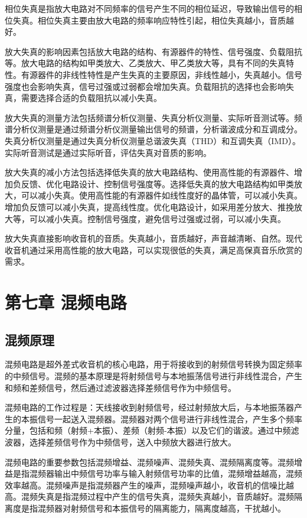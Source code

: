 \documentclass[12pt,UTF8]{ctexbook}
\begin{document}
相位失真是指放大电路对不同频率的信号产生不同的相位延迟，导致输出信号的相位失真。相位失真主要由放大电路的频率响应特性引起，相位失真越小，音质越好。

放大失真的影响因素包括放大电路的结构、有源器件的特性、信号强度、负载阻抗等。放大电路的结构如甲类放大、乙类放大、甲乙类放大等，具有不同的失真特性。有源器件的非线性特性是产生失真的主要原因，非线性越小，失真越小。信号强度也会影响失真，信号过强或过弱都会增加失真。负载阻抗的选择也会影响失真，需要选择合适的负载阻抗以减小失真。

放大失真的测量方法包括频谱分析仪测量、失真分析仪测量、实际听音测试等。频谱分析仪测量是通过频谱分析仪测量输出信号的频谱，分析谐波成分和互调成分。失真分析仪测量是通过失真分析仪测量总谐波失真（THD）和互调失真（IMD）。实际听音测试是通过实际听音，评估失真对音质的影响。

放大失真的减小方法包括选择低失真的放大电路结构、使用高性能的有源器件、增加负反馈、优化电路设计、控制信号强度等。选择低失真的放大电路结构如甲类放大，可以减小失真。使用高性能的有源器件如线性度好的晶体管，可以减小失真。增加负反馈可以减小失真，提高线性度。优化电路设计，如采用差分放大、推挽放大等，可以减小失真。控制信号强度，避免信号过强或过弱，可以减小失真。

放大失真直接影响收音机的音质。失真越小，音质越好，声音越清晰、自然。现代收音机通过采用高性能的放大电路，可以实现很低的失真，满足高保真音乐欣赏的需求。

\chapter{第七章 混频电路}

\section{混频原理}

混频电路是超外差式收音机的核心电路，用于将接收到的射频信号转换为固定频率的中频信号。混频的基本原理是将射频信号与本地振荡信号进行非线性混合，产生和频和差频信号，然后通过滤波器选择差频信号作为中频信号。

混频电路的工作过程是：天线接收到射频信号，经过射频放大后，与本地振荡器产生的本振信号一起送入混频器。混频器对两个信号进行非线性混合，产生多个频率分量，包括和频（射频+本振）、差频（射频-本振）以及它们的谐波。通过中频滤波器，选择差频信号作为中频信号，送入中频放大器进行放大。

混频电路的重要参数包括混频增益、混频噪声、混频失真、混频隔离度等。混频增益是指混频器输出中频信号功率与输入射频信号功率的比值，混频增益越高，混频效率越高。混频噪声是指混频器产生的噪声，混频噪声越小，收音机的信噪比越高。混频失真是指混频过程中产生的信号失真，混频失真越小，音质越好。混频隔离度是指混频器对射频信号和本振信号的隔离能力，隔离度越高，干扰越小。
\end{document}
